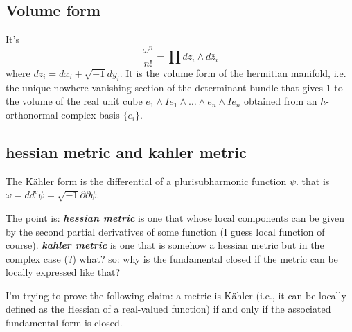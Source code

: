 \subsection{Volume form}
It's
\[\frac{\omega^n}{n!}=\prod dz_i \wedge d\bar{z}_i\]
where \(dz_i=dx_i + \sqrt{-1}dy_i\). It is the volume form of the hermitian manifold, i.e. the unique nowhere-vanishing section of the determinant bundle that gives 1 to the volume of the real unit cube \(e_1 \wedge Ie_1\wedge\ldots\wedge e_n \wedge I e_n\) obtained from an \(h\)-orthonormal complex basis \(\{e_i\}\).

\subsection{hessian metric and kahler metric}

The Kähler form is the differential of a plurisubharmonic function \(\psi\). that is \(\omega=d d^c \psi=\sqrt{-1} \partial \partial \psi\).

The point is: \textit{\textbf{hessian metric}} is one that whose local components can be given by the second partial derivatives of some function (I guess local function of course). \textit{\textbf{kahler metric}} is one that is somehow a hessian metric but in the complex case (?) what? so: why is the fundamental closed if the metric can be locally expressed like that?

\begin{exercise}\leavevmode
I’m trying to prove the following claim: a metric is Kähler (i.e., it can be locally defined as the Hessian of a real-valued function) if and only if the associated fundamental form is closed.
\end{exercise}

